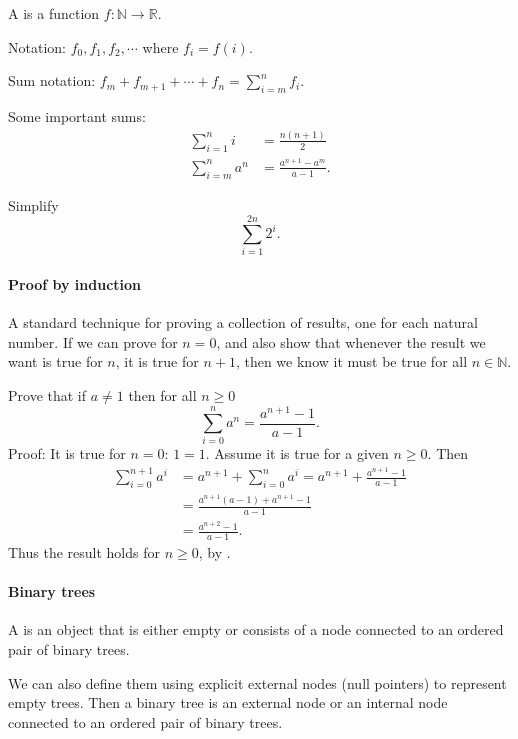 A  is a function $f:\mathbb{N} \to \mathbb{R}$. 

Notation: $f_0, f_1, f_2, \cdots$ where $f_i = f(i)$.

Sum notation: $f_m+f_{m+1}+\cdots +f_n = \sum_{i=m}^n f_i$.

Some important sums: 
\begin{align*}
\sum_{i=1}^n i & = \frac{n(n+1)}{2} \\
\sum_{i=m}^n a^n&  = \frac{a^{n+1}-a^m}{a-1}.
\end{align*}

\begin{Boxample}[4]
Simplify 
$$
\sum_{i=1}^{2n} 2^i.
$$
\end{Boxample}

\paragraph{Proof by induction}
A standard technique for proving a collection of results, one for each natural number. If we can prove for $n=0$, and also show that whenever the result we want is true for $n$, it is true for $n+1$, then we know it must be true for all $n\in \mathbb{N}$.

\begin{Example}
Prove that if $a\neq 1$ then for all  $n\geq 0$
$$
\sum_{i=0}^n a^n = \frac{a^{n+1} - 1}{a - 1}.
$$
Proof: It is true for $n=0$: $1 = 1$. Assume it is true for a given  $n\geq 0$. Then
\begin{align*}
\sum_{i=0}^{n+1} a^i & = a^{n+1} + \sum_{i=0}^n a^i 
= a^{n+1} + \frac{a^{n+1} - 1}{a-1} \\
& = \frac{a^{n+1} (a - 1) + a^{n+1} - 1}{a-1}\\
& = \frac{a^{n+2} - 1}{a-1}.
\end{align*}
Thus the result holds for  $n\geq 0$, by .
\end{Example}



\paragraph{Binary trees}

A  is an object that is either empty or consists of a  node connected to an ordered pair of binary trees. 
 
We can also define them using explicit external nodes (null pointers) to represent empty trees. Then a binary tree is an external node or an internal node connected to an ordered pair of binary trees.
 

